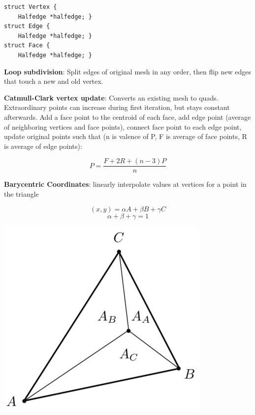 \documentclass[9pt,landscape]{extarticle}
\begin{document}
\begin{multicols}{3}
\begin{multicols}{2}
\columnbreak

\begin{verbatim}
struct Vertex {
    Halfedge *halfedge; }
struct Edge {
    Halfedge *halfedge; }
struct Face {
    Halfedge *halfedge; }
\end{verbatim}
\end{multicols}

\textbf{Loop subdivision}: Split edges of original mesh in any order, then flip new edges that touch a new and old vertex.

\textbf{Catmull-Clark vertex update}: Converts an existing mesh to quads. Extraordinary points can increase during first iteration, but stays constant afterwards. Add a face point to the centroid of each face, add edge point (average of neighboring vertices and face points), connect face point to each edge point, update original points such that (n is valence of P, F is average of face points, R is average of edge points):

$$
P = \frac{F + 2R +(n-3)P}{n}
$$

\textbf{Barycentric Coordinates}: linearly interpolate values at vertices for a point in the triangle

$$(x, y) = \alpha A + \beta B + \gamma C$$
$$\alpha + \beta + \gamma = 1$$

\begin{multicols}{2}

\includegraphics[scale=0.2]{barycentric_area}

\columnbreak


\end{multicols}
\end{multicols}
\end{document}
